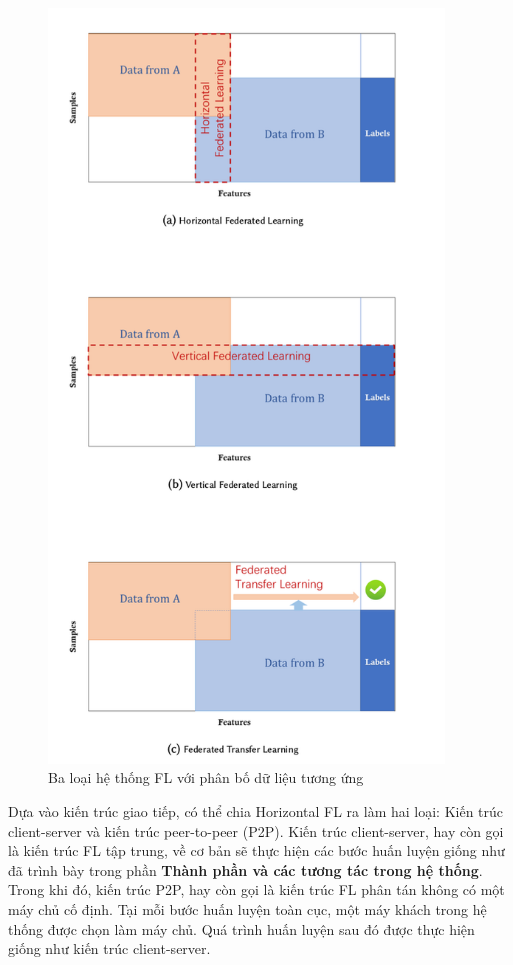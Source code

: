 \begin{figure}[H]
    \begin{center}
        \includegraphics[height=20cm]{images/taxonomy_fl.png}
        \caption{Ba loại hệ thống FL với phân bố dữ liệu tương ứng \cite{yang2019federated}}
        \label{fig:taxonomy_fl}
    \end{center}
\end{figure}

Dựa vào kiến trúc giao tiếp, có thể chia Horizontal FL ra làm hai loại: Kiến trúc client-server và kiến trúc peer-to-peer (P2P). Kiến trúc client-server, hay còn gọi là kiến trúc FL tập trung, về cơ bản sẽ thực hiện các bước huấn luyện giống như đã trình bày trong phần \textbf{Thành phần và các tương tác trong hệ thống}. Trong khi đó, kiến trúc P2P, hay còn gọi là kiến trúc FL phân tán không có một máy chủ cố định. Tại mỗi bước huấn luyện toàn cục, một máy khách trong hệ thống được chọn làm máy chủ. Quá trình huấn luyện sau đó được thực hiện giống như kiến trúc client-server.

